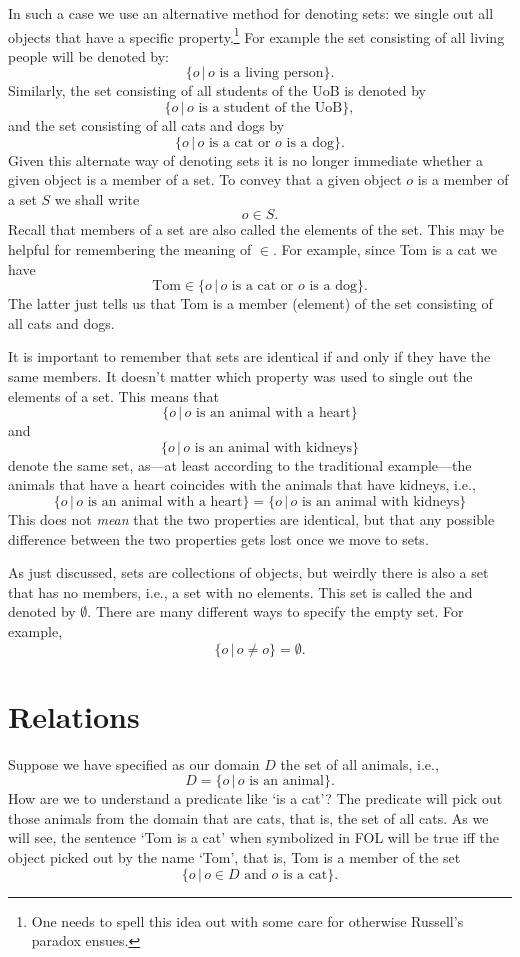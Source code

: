 In such a case we use an alternative method for denoting sets: we single out all objects that have a specific property.\footnote{One needs to spell this idea out with some care for otherwise Russell's paradox ensues.} For example the set consisting of all living people will be denoted by:
$$\{o\,|\,o\text{ is a living person}\}.$$
Similarly, the set consisting of all students of the UoB is denoted by
$$\{o\,|\,o\text{ is a student of the UoB}\},$$
and the set consisting of all cats and dogs by
$$\{o\,|\,o\text{ is a cat or }o\text{ is a dog}\}.$$
Given this alternate way of denoting sets it is no longer immediate whether a given object is a member of a set. To convey that a given object $o$ is a member of a set $S$ we shall write
$$o\in S.$$
Recall that members of a set are also called the elements of the set. This may be helpful for remembering the meaning of $\in$. For example, since Tom is a cat we have
$$\text{Tom}\in\{o\,|\,o\text{ is a cat or }o\text{ is a dog}\}.$$
The latter just tells us that Tom is a member (element) of the set consisting of all cats and dogs. 

It is important to remember that sets are identical if and only if they have the same members. It doesn't matter which property was used to single out the elements of a set. This means that 
$$\{o\,|\,o\text{ is an animal with a heart}\}$$
and $$\{o\,|\,o\text{ is an animal with kidneys}\}$$
denote the same set, as---at least according to the traditional example---the animals that have a heart coincides with the animals that have kidneys, i.e.,
$$\{o\,|\,o\text{ is an animal with a heart}\}=\{o\,|\,o\text{ is an animal with kidneys}\}$$
This does not \emph{mean} that the two properties are identical, but that any possible difference between the two properties gets lost once we move to sets.

As just discussed, sets are collections of objects, but weirdly there is also a set that has no members, i.e., a set with no elements. This set is called the  and denoted by $\emptyset$. There are many different ways to specify the empty set. For example,
$$\{o\,|\,o\neq o\}=\emptyset.$$



\section{Relations}
Suppose we have specified as our domain $D$ the set of all animals, i.e.,
$$D=\{o\,|\,o\text{ is an animal}\}.$$
How are we to understand a predicate like `is a cat'? The predicate will pick out those animals from the domain that are cats, that is, the set of all cats. As we will see, the sentence `Tom is a cat' when symbolized in FOL will be true iff the object picked out by the name `Tom', that is, Tom is a member of the set
$$\{o\,|\,o\in D\text{ and }o\text{ is a cat}\}.$$

